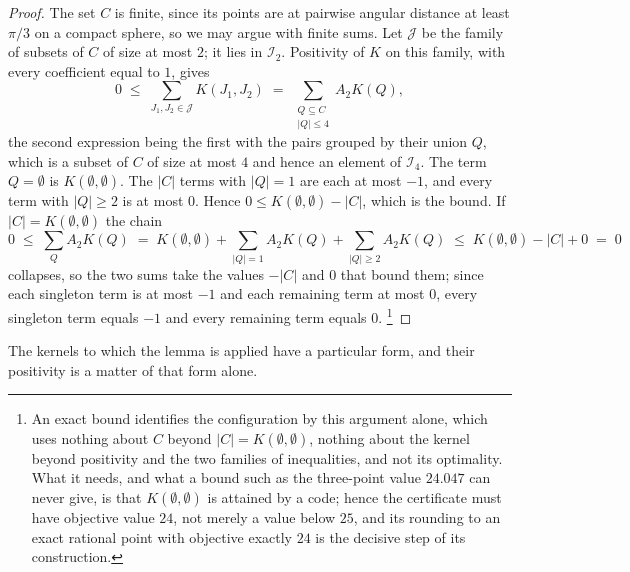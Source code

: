 \documentclass[11pt,reqno]{amsart}
\renewcommand{\_}{\origunderscore\allowbreak}
\numberwithin{equation}{section}
\theoremstyle{plain}
\theoremstyle{definition}
\theoremstyle{remark}
\begin{document}
\begin{proof}
The set $C$ is finite, since its points are at pairwise angular distance
at least $\pi/3$ on a compact sphere, so we may argue with finite
sums. Let $\mathcal J$ be the family of subsets of $C$ of size at most
$2$; it lies in $\mathcal I_2$. Positivity of $K$ on this family, with every
coefficient equal to $1$, gives
\[
  0\;\le\;\sum_{J_1,J_2\in\mathcal J}K(J_1,J_2)
  \;=\;\sum_{\substack{Q\subseteq C\\ |Q|\le4}}A_2K(Q),
\]
the second expression being the first with the pairs grouped by their
union $Q$, which is a subset of $C$ of size at most $4$ and hence an
element of $\mathcal I_4$. The term $Q=\emptyset$ is $K(\emptyset,\emptyset)$.
The $|C|$ terms with $|Q|=1$ are each at most $-1$, and every term with
$|Q|\ge2$ is at most $0$. Hence $0\le K(\emptyset,\emptyset)-|C|$, which is
the bound. If $|C|=K(\emptyset,\emptyset)$ the chain
\[
  0\;\le\;\sum_{Q}A_2K(Q)
  \;=\;K(\emptyset,\emptyset)+\sum_{|Q|=1}A_2K(Q)+\sum_{|Q|\ge2}A_2K(Q)
  \;\le\;K(\emptyset,\emptyset)-|C|+0\;=\;0
\]
collapses, so the two sums take the values $-|C|$ and $0$ that bound
them; since each singleton term is at most $-1$ and each remaining term at
most $0$, every singleton term equals $-1$ and every remaining term
equals $0$.%
\footnote{An exact bound identifies the configuration by this argument
  alone, which uses nothing about $C$ beyond
  $|C|=K(\emptyset,\emptyset)$, nothing about the kernel beyond positivity
  and the two families of inequalities, and not its optimality. What it
  needs, and what a bound such as the three-point value $24.047$ can never
  give, is that $K(\emptyset,\emptyset)$ is attained by a code; hence the
  certificate must have objective value $24$, not merely a value below
  $25$, and its rounding to an exact rational point with objective exactly
  $24$ is the decisive step of its construction.}
\end{proof}

The kernels to which the lemma is applied have a particular form, and
their positivity is a matter of that form alone.
\end{document}
